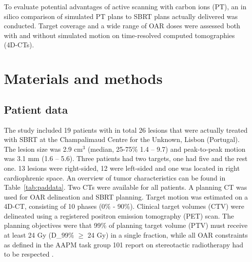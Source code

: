 \documentclass[type=dr, dr=rernat, acm$^3$entcolor=tud7b,colorbacktitle, bigchapter, openright, twoside, 12pt ]{tudthesis}
\begin{document}
To evaluate potential advantages of active scanning with carbon ions (PT), an in silico comparison of simulated PT plans to SBRT plans actually delivered was conducted. Target coverage and a wide range of OAR doses were assessed both with and without simulated motion on time-resolved computed tomographies (4D-CTs).



\section{Materials and methods}

\subsection{Patient data}

The study included 19 patients with in total 26 lesions that were actually treated with SBRT at the Champalimaud Centre for the Unknown, Lisbon (Portugal). The lesion size was 2.9 cm$^3$ (median, 25-75\% 1.4 – 9.7) and peak-to-peak motion was 3.1 mm (1.6 – 5.6). Three patients had two targets, one had five and the rest one. 13 lesions were right-sided, 12 were left-sided and one was located in right cardiophrenic space. An overview of tumor characteristics can be found in Table~\ref{tab:paddata}.
Two CTs were available for all patients. A planning CT was used for OAR delineation and SBRT planning. Target motion was estimated on a 4D-CT, consisting of 10 phases (0\% - 90\%). Clinical target volumes (CTV) were delineated using a registered positron emission tomography (PET) scan.
The planning objectives were that 99\% of planning target volume (PTV) must receive at least 24 Gy (D_{99}\% $\geq$ 24 Gy) in a single fraction, while all OAR constraints as defined in the AAPM task group 101 report on stereotactic radiotherapy had to be respected \cite{Benedict2010}.
\end{document}
